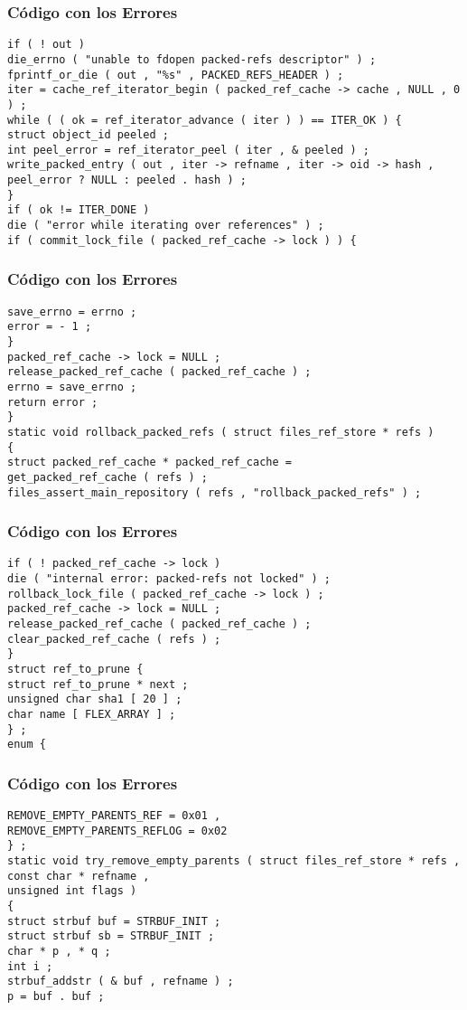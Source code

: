 \documentclass{beamer}
\begin{document}
\begin{frame}[fragile]
\frametitle{C\'odigo con los Errores}
\begin{verbatim}
if ( ! out ) 
die_errno ( "unable to fdopen packed-refs descriptor" ) ; 
fprintf_or_die ( out , "%s" , PACKED_REFS_HEADER ) ; 
iter = cache_ref_iterator_begin ( packed_ref_cache -> cache , NULL , 0 ) ; 
while ( ( ok = ref_iterator_advance ( iter ) ) == ITER_OK ) { 
struct object_id peeled ; 
int peel_error = ref_iterator_peel ( iter , & peeled ) ; 
write_packed_entry ( out , iter -> refname , iter -> oid -> hash , 
peel_error ? NULL : peeled . hash ) ; 
} 
if ( ok != ITER_DONE ) 
die ( "error while iterating over references" ) ; 
if ( commit_lock_file ( packed_ref_cache -> lock ) ) { 
\end{verbatim}
\end{frame}
\begin{frame}[fragile]
\frametitle{C\'odigo con los Errores}
\begin{verbatim}
save_errno = errno ; 
error = - 1 ; 
} 
packed_ref_cache -> lock = NULL ; 
release_packed_ref_cache ( packed_ref_cache ) ; 
errno = save_errno ; 
return error ; 
} 
static void rollback_packed_refs ( struct files_ref_store * refs ) 
{ 
struct packed_ref_cache * packed_ref_cache = 
get_packed_ref_cache ( refs ) ; 
files_assert_main_repository ( refs , "rollback_packed_refs" ) ; 
\end{verbatim}
\end{frame}
\begin{frame}[fragile]
\frametitle{C\'odigo con los Errores}
\begin{verbatim}
if ( ! packed_ref_cache -> lock ) 
die ( "internal error: packed-refs not locked" ) ; 
rollback_lock_file ( packed_ref_cache -> lock ) ; 
packed_ref_cache -> lock = NULL ; 
release_packed_ref_cache ( packed_ref_cache ) ; 
clear_packed_ref_cache ( refs ) ; 
} 
struct ref_to_prune { 
struct ref_to_prune * next ; 
unsigned char sha1 [ 20 ] ; 
char name [ FLEX_ARRAY ] ; 
} ; 
enum { 
\end{verbatim}
\end{frame}
\begin{frame}[fragile]
\frametitle{C\'odigo con los Errores}
\begin{verbatim}
REMOVE_EMPTY_PARENTS_REF = 0x01 , 
REMOVE_EMPTY_PARENTS_REFLOG = 0x02 
} ; 
static void try_remove_empty_parents ( struct files_ref_store * refs , 
const char * refname , 
unsigned int flags ) 
{ 
struct strbuf buf = STRBUF_INIT ; 
struct strbuf sb = STRBUF_INIT ; 
char * p , * q ; 
int i ; 
strbuf_addstr ( & buf , refname ) ; 
p = buf . buf ; 
\end{verbatim}
\end{frame}
\end{document}
